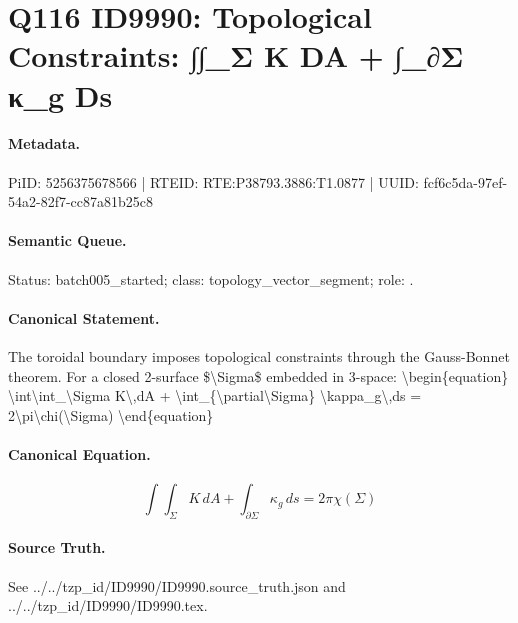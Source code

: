 \section*{Q116 ID9990: Topological Constraints: ∫∫\_Σ K DA + ∫\_∂Σ κ\_g Ds}
\paragraph{Metadata.}
PiID: 5256375678566 | RTEID: RTE:P38793.3886:T1.0877 | UUID: fcf6c5da-97ef-54a2-82f7-cc87a81b25c8

\paragraph{Semantic Queue.}
Status: batch005\_started; class: topology\_vector\_segment; role: .

\paragraph{Canonical Statement.}
The toroidal boundary imposes topological constraints through the Gauss-Bonnet theorem. For a closed 2-surface \$\textbackslash{}Sigma\$ embedded in 3-space: \textbackslash{}begin\{equation\} \textbackslash{}int\textbackslash{}int\_\textbackslash{}Sigma K\textbackslash{},dA + \textbackslash{}int\_\{\textbackslash{}partial\textbackslash{}Sigma\} \textbackslash{}kappa\_g\textbackslash{},ds = 2\textbackslash{}pi\textbackslash{}chi(\textbackslash{}Sigma) \textbackslash{}end\{equation\}

\paragraph{Canonical Equation.}
\[
\int\int_\Sigma K\,dA + \int_{\partial\Sigma} \kappa_g\,ds = 2\pi\chi(\Sigma)
\]

\paragraph{Source Truth.}
See ../../tzp\_id/ID9990/ID9990.source\_truth.json and ../../tzp\_id/ID9990/ID9990.tex.
